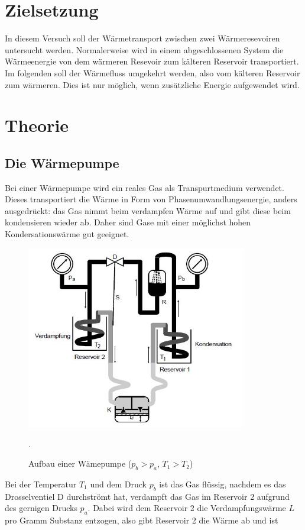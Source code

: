 
\section{Zielsetzung}
In diesem Versuch soll der Wärmetransport zwischen zwei Wärmeresevoiren untersucht werden.
Normalerweise wird in einem abgeschlossenen System die Wärmeenergie von dem wärmeren Resevoir zum
kälteren Reservoir transportiert. Im folgenden soll der Wärmefluss umgekehrt werden, also vom
kälteren Reservoir zum wärmeren. Dies ist nur möglich, wenn zusätzliche Energie
aufgewendet wird.

\section{Theorie}
\subsection{Die Wärmepumpe}
Bei einer Wärmepumpe wird ein reales Gas als Transpurtmedium verwendet. Dieses transportiert die
Wärme in Form von Phasenumwandlungsenergie, anders ausgedrückt: das Gas nimmt beim
verdampfen Wärme auf und gibt diese beim kondensieren wieder ab.
Daher sind Gase mit einer möglichst hohen Kondersationswärme gut geeignet.
\begin{figure}[H]
  \centering
  \includegraphics[height=8cm]{Pumpe.JPG}
  \caption{Aufbau einer Wämepumpe ($p_{b}>p_{a}$, $T_{1}>T_{2}$)}
  \cite{skript}.
  \label{fig:pumpe}
\end{figure}
Bei der Temperatur $T_{1}$ und dem Druck $p_{b}$ ist das Gas flüssig, nachdem es das Drosselventiel D durchströmt
hat, verdampft das Gas im Reservoir 2 aufgrund des gernigen Drucks $p_{a}$. Dabei wird dem
Reservoir 2 die Verdampfungswärme $L$ pro Gramm Substanz entzogen, also gibt Reservoir 2 die Wärme ab und ist
